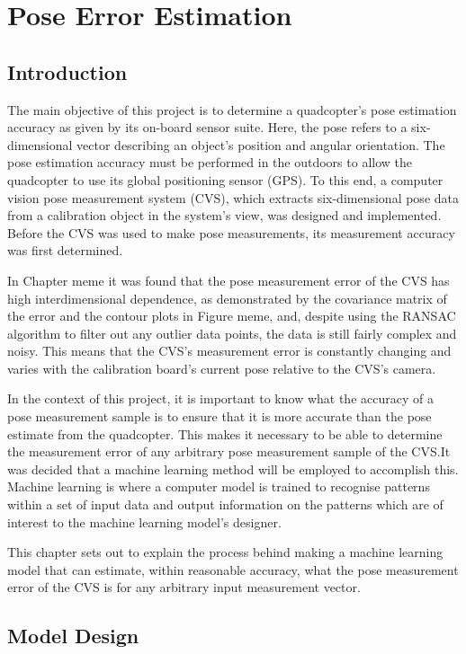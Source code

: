 \chapter{Pose Error Estimation}

\section{Introduction}

The main objective of this project is to determine a quadcopter's pose estimation accuracy as given by its on-board sensor suite. Here, the pose refers to a six-dimensional vector describing an object's position and angular orientation. The pose estimation accuracy must be performed in the outdoors to allow the quadcopter to use its global positioning sensor (GPS). To this end, a computer vision pose measurement system (CVS), which extracts six-dimensional pose data from a calibration object in the system's view, was designed and implemented. Before the CVS was used to make pose measurements, its measurement accuracy was first determined. 

In Chapter meme it was found that the pose measurement error of the CVS has high interdimensional dependence, as demonstrated by the covariance matrix of the error and the contour plots in Figure meme, and, despite using the RANSAC algorithm to filter out any outlier data points, the data is still fairly complex and noisy. This means that the CVS's measurement error is constantly changing and varies with the calibration board's current pose relative to the CVS's camera.

In the context of this project, it is important to know what the accuracy of a pose measurement sample is to ensure that it is more accurate than the pose estimate from the quadcopter. This makes it necessary to be able to determine the measurement error of any arbitrary pose measurement sample of the CVS.\@ It was decided that a machine learning method will be employed to accomplish this. Machine learning is where a computer model is trained to recognise patterns within a set of input data and output information on the patterns which are of interest to the machine learning model's designer. 

This chapter sets out to explain the process behind making a machine learning model that can estimate, within reasonable accuracy, what the pose measurement error of the CVS is for any arbitrary input measurement vector. 

\section{Model Design}

